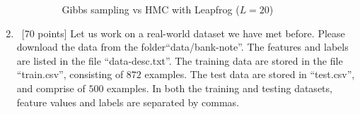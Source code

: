 \documentclass[12pt, fullpage,letterpaper]{article}
\begin{document}
\begin{enumerate}
\begin{enumerate}
\begin{figure}[H]
	\begin{center}
	 \end{center}
	 \caption{{\footnotesize Gibbs sampling vs HMC with Leapfrog ($L=20$)}}\label{Fig3}    
	\end{figure}
	\end{enumerate}

	\item~[70 points] Let us work on a real-world dataset we have met before. Please download the data from the folder``data/bank-note''. The features and labels are listed in the file ``data-desc.txt''. The training data are stored in the file ``train.csv'', consisting of $872$ examples. The test data are stored in ``test.csv'', and comprise of $500$ examples. In both the training and testing datasets, feature values and labels are separated by commas. 
	 

\end{enumerate}
\end{document}
